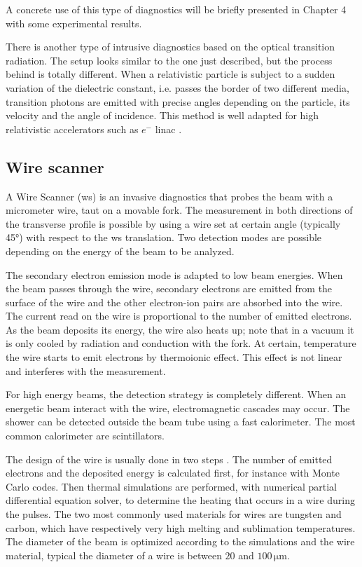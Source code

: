 \begin{refsection}
  A concrete use of this type of diagnostics will be briefly presented in Chapter 4 with some experimental results.

  There is another type of intrusive diagnostics based on the optical transition radiation. The setup looks similar to the one just described, but the process behind is totally different. When a relativistic particle is subject to a sudden variation of the dielectric constant, i.e. passes the border of two different media, transition photons are emitted with precise angles depending on the particle, its velocity and the angle of incidence. This method is well adapted for high relativistic accelerators such as $e^{-}$ \acrshort{linac} \cite{Nolle2009,Bolzon2013}.

  \subsection{Wire scanner}
  A Wire Scanner (\acrshort{ws}) is an invasive diagnostics that probes the beam with a micrometer wire, taut on a movable fork. The measurement in both directions of the transverse profile is possible by using a wire set at certain angle (typically 45°) with respect to the \acrshort{ws} translation. Two detection modes are possible depending on the energy of the beam to be analyzed.

  The secondary electron emission mode is adapted to low beam energies. When the beam passes through the wire, secondary electrons are emitted from the surface of the wire and the other electron-ion pairs are absorbed into the wire. The current read on the wire is proportional to the number of emitted electrons. As the beam deposits its energy, the wire also heats up; note that in a vacuum it is only cooled by radiation and conduction with the fork. At certain, temperature the wire starts to emit electrons by thermoionic effect. This effect is not linear and interferes with the measurement.

  For high energy beams, the detection strategy is completely different. When an energetic beam interact with the wire, electromagnetic cascades may occur. The shower can be detected outside the beam tube using a fast calorimeter. The most common calorimeter are scintillators.%

  The design of the wire is usually done in two steps \cite{Cheymol:LINAC2014-MOPP036}. The number of emitted electrons and the deposited energy is calculated first, for instance with Monte Carlo codes. Then thermal simulations are performed, with numerical partial differential equation solver, to determine the heating that occurs in a wire during the pulses. The two most commonly used materials for wires are tungsten and carbon, which have respectively very high melting and sublimation temperatures. The diameter of the beam is optimized according to the simulations and the wire material, typical the diameter of a wire is between $20$ and $100\,\mathrm{\mu m}$.


\end{refsection}
